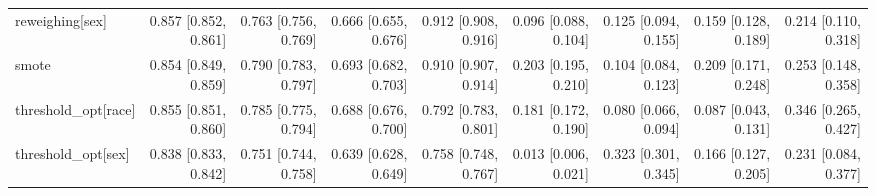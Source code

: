 \begin{table}[t]
{\begin{tabular}{lrrrrrrrr}
reweighing[sex] & 0.857 [0.852, 0.861] & 0.763 [0.756, 0.769] & 0.666 [0.655, 0.676] & 0.912 [0.908, 0.916] & 0.096 [0.088, 0.104] & 0.125 [0.094, 0.155] & 0.159 [0.128, 0.189] & 0.214 [0.110, 0.318] \\
smote & 0.854 [0.849, 0.859] & 0.790 [0.783, 0.797] & 0.693 [0.682, 0.703] & 0.910 [0.907, 0.914] & 0.203 [0.195, 0.210] & 0.104 [0.084, 0.123] & 0.209 [0.171, 0.248] & 0.253 [0.148, 0.358] \\
threshold\_opt[race] & 0.855 [0.851, 0.860] & 0.785 [0.775, 0.794] & 0.688 [0.676, 0.700] & 0.792 [0.783, 0.801] & 0.181 [0.172, 0.190] & 0.080 [0.066, 0.094] & 0.087 [0.043, 0.131] & 0.346 [0.265, 0.427] \\
threshold\_opt[sex] & 0.838 [0.833, 0.842] & 0.751 [0.744, 0.758] & 0.639 [0.628, 0.649] & 0.758 [0.748, 0.767] & 0.013 [0.006, 0.021] & 0.323 [0.301, 0.345] & 0.166 [0.127, 0.205] & 0.231 [0.084, 0.377] \\
\bottomrule
\end{tabular}}
\end{table}
